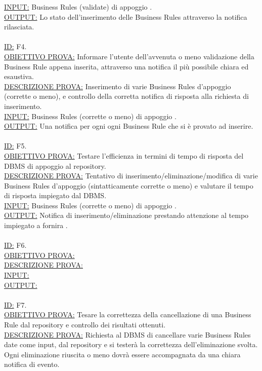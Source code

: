 \documentclass[11pt,titlepage,a4paper]{report}
\begin{document}
\underline{INPUT:} Business Rules (validate) di appoggio .\\
\underline{OUTPUT:} Lo stato dell'inserimento delle Business Rules attraverso la notifica rilasciata.\\
\\
\underline{ID:} F4.\\
\underline{OBIETTIVO PROVA:} Informare l'utente dell'avvenuta o meno validazione della Business Rule appena inserita, attraverso una notifica il pi\`u possibile chiara ed esaustiva. \\
\underline{DESCRIZIONE PROVA:} Inserimento di varie Business Rules d'appoggio (corrette o meno), e controllo della corretta notifica di risposta alla richiesta di inserimento.\\
\underline{INPUT:} Business Rules (corrette o meno) di appoggio .\\
\underline{OUTPUT:} Una notifica per ogni ogni Business Rule che si \`e provato ad inserire.\\
\\
\underline{ID:} F5.\\
\underline{OBIETTIVO PROVA:} Testare l'efficienza in termini di tempo di risposta del DBMS di appoggio al repository. \\
\underline{DESCRIZIONE PROVA:} Tentativo di inserimento/eliminazione/modifica di varie Business Rules d'appoggio (sintatticamente corrette o meno) e valutare il tempo di risposta impiegato dal DBMS.\\
\underline{INPUT:} Business Rules (corrette o meno) di appoggio .\\
\underline{OUTPUT:} Notifica di inserimento/eliminazione prestando attenzione al tempo impiegato a fornira .\\
\\
\underline{ID:} F6.\\
\underline{OBIETTIVO PROVA:}  \\
\underline{DESCRIZIONE PROVA:} \\
\underline{INPUT:} \\
\underline{OUTPUT:} \\
\\
\underline{ID:} F7.\\
\underline{OBIETTIVO PROVA:} Tesare la correttezza della cancellazione di una Business Rule dal repository e controllo dei risultati ottenuti. \\
\underline{DESCRIZIONE PROVA:} Richiesta al DBMS di cancellare varie Business Rules date come input, dal repository e si tester\`a la correttezza dell'eliminazione svolta. Ogni eliminazione riuscita o meno dovr\`a essere accompagnata da una chiara notifica di evento.\\
\end{document}
